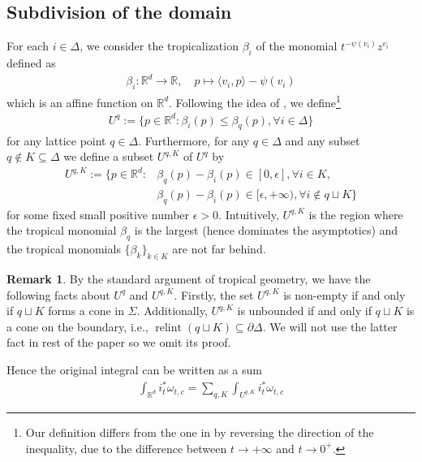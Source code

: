 \documentclass[11pt,reqno]{amsart}
\def\R {{\mathbb R}}
\theoremstyle{definition}
\newtheorem{remark}[theorem]{Remark}
\numberwithin{equation}{section}
\begin{document}
\subsection{Subdivision of the domain}\label{subdivision}


For each $i\in\Delta$, we consider the tropicalization $\beta_i$ of the monomial $t^{-\psi(v_i)}z^{v_i}$ defined as
\begin{align*}
	\beta_i:\R^d\rightarrow\R,\quad p\mapsto \langle v_i,p\rangle -\psi(v_i)
\end{align*}
which is an affine function on $\R^d$. Following the idea of \cite{AGIS}, we define\footnote{Our definition differs from the one in \cite{AGIS} by reversing the direction of the inequality, due to the difference between $t\rightarrow +\infty$ and $t\rightarrow 0^+$. }
\begin{align*}
	U^q:=\{p\in\R^d: \beta_i(p)\leq \beta_q(p),\forall i\in\Delta\}
\end{align*}
for any lattice point $q\in\Delta$. Furthermore, for any $q\in\Delta$ and any subset $q\not\in K\subseteq\Delta$ we define a subset $U^{q,K}$ of $U^q$ by
\begin{align*}
	U^{q,K}:=\{p\in\R^d: &\beta_q(p)-\beta_i(p)\in[0,\epsilon],\forall i\in K, \\
	&\beta_q(p)-\beta_i(p)\in[\epsilon,+\infty),\forall i\not\in q\sqcup K\}
\end{align*}
for some fixed small positive number $\epsilon>0$. Intuitively, $U^{q,K}$ is the region where the tropical monomial $\beta_q$ is the largest (hence dominates the asymptotics) and the tropical monomials $\{\beta_k\}_{k\in K}$ are not far behind.

\smallskip

\begin{remark}
	By the standard argument of tropical geometry, we have the following facts about $U^q$ and $U^{q,K}$. Firstly, the set $U^{q,K}$ is non-empty if and only if $q\sqcup K$ forms a cone in $\Sigma$. Additionally, $U^{q,K}$ is unbounded if and only if $q\sqcup K$ is a cone on the boundary, i.e., $\operatorname{relint}(q\sqcup K)\subseteq\partial\Delta$. We will not use the latter fact in rest of the paper so we omit its proof.
\end{remark}

\smallskip


Hence the original integral can be written as a sum
\begin{align*}
	\int_{\R^d}i_t^*\omega_{t,c}=\sum_{q,K}\int_{U^{q,K}}i_t^*\omega_{t,c}
\end{align*}
\end{document}
